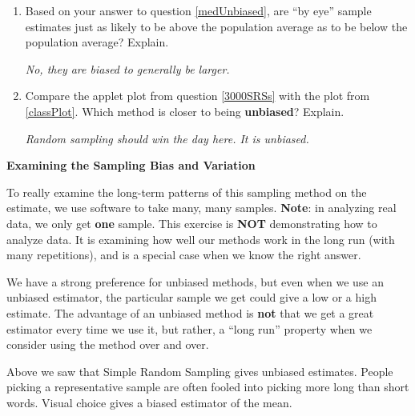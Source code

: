 \begin{enumerate}
     \item Based on your answer to question \ref{medUnbiased}, are 
       ``by eye'' sample estimates just as likely to be above the population
       average as  to be below the population average?  Explain.      
\begin{students}
  \vspace{1cm}
\end{students}    
\begin{key}
   {\it No, they are biased to generally be larger.}
\end{key}

     \item Compare the applet plot from question \ref{3000SRSs} with
       the plot from \ref{classPlot}.  Which method is closer to being {\bf
         unbiased}? Explain.
\begin{students}
  \vspace{3cm}
\end{students}    
\begin{key}
   {\it  Random sampling should win the day here.  It is unbiased.}
\end{key}
     
     \end{enumerate}
     
       \begin{center}
         {\bf Examining the Sampling Bias and Variation}
       \end{center}
       To really examine the long-term patterns of this sampling
       method on the estimate, we use software to take many, many
       samples. {\bf Note}: in analyzing real data, we only get {\bf
         one} sample. This exercise is {\bf NOT} demonstrating how to
       analyze data. It is examining how well our methods work in the
       long run (with many repetitions), and is a special case when
       we know the right answer.

       We have a strong preference for unbiased methods, but even when
       we use an unbiased estimator, the particular sample we get
       could give a low or a high estimate.  The advantage of
       an unbiased method is {\bf not} that we get a great estimator
       every time we use it, but rather, a ``long run'' property when
       we consider using the method over and over.

       Above we saw that Simple Random Sampling gives
       unbiased estimates.  People picking a representative sample are
       often fooled into picking more long than short words.  Visual
       choice gives a biased estimator of the mean.

